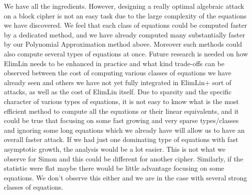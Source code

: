 We have all the ingredients. However, designing a really optimal algebraic attack on a block cipher is not an easy task due to the large complexity of the equations we have discovered. 
We feel that each class of equations could be computed faster by a dedicated method, 
and we have already computed many substantially faster by our Polynomial Approximation method above. 
Moreover such methods could also compute several types of equations at once. 
Future research is needed on how ElimLin needs to be enhanced in practice and what kind trade-offs can be observed between the cost of computing various classes of equations we have already seen and others we have not yet fully integrated in ElimLin+ sort of attacks, as well as the cost of ElimLin itself. Due to sparsity and the specific character of various types of equations, it is not easy to know what is the most efficient method to compute all the equations or their linear equivalents, and it could be true that focusing on some fast growing 
and very sparse types/classes and ignoring some long equations which we already have will allow us to have an overall faster attack. 
If we had just one dominating type of equations with fast asymptotic growth, the analysis would be a lot easier. This is not what we observe for Simon and this could be different for another cipher. Similarly, if the statistic were flat maybe there would be little advantage focusing on some equations. 
We don't observe this either and we are in the case with several strong classes of equations. 

